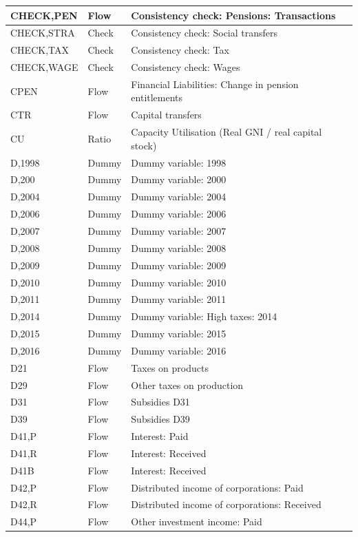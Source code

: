 \documentclass[
]{book}
\begin{document}
\begin{tabular}[t]{l|l|l}
\hline
CHECK,PEN & Flow & Consistency check: Pensions: Transactions\\
\hline
CHECK,STRA & Check & Consistency check: Social transfers\\
\hline
CHECK,TAX & Check & Consistency check: Tax\\
\hline
CHECK,WAGE & Check & Consistency check: Wages\\
\hline
CPEN & Flow & Financial Liabilities: Change in pension entitlements\\
\hline
CTR & Flow & Capital transfers\\
\hline
CU & Ratio & Capacity Utilisation (Real GNI  /  real capital stock)\\
\hline
D,1998 & Dummy & Dummy variable: 1998\\
\hline
D,200 & Dummy & Dummy variable: 2000\\
\hline
D,2004 & Dummy & Dummy variable: 2004\\
\hline
D,2006 & Dummy & Dummy variable: 2006\\
\hline
D,2007 & Dummy & Dummy variable: 2007\\
\hline
D,2008 & Dummy & Dummy variable: 2008\\
\hline
D,2009 & Dummy & Dummy variable: 2009\\
\hline
D,2010 & Dummy & Dummy variable: 2010\\
\hline
D,2011 & Dummy & Dummy variable: 2011\\
\hline
D,2014 & Dummy & Dummy variable: High taxes: 2014\\
\hline
D,2015 & Dummy & Dummy variable: 2015\\
\hline
D,2016 & Dummy & Dummy variable: 2016\\
\hline
D21 & Flow & Taxes on products\\
\hline
D29 & Flow & Other taxes on production\\
\hline
D31 & Flow & Subsidies D31\\
\hline
D39 & Flow & Subsidies D39\\
\hline
D41,P & Flow & Interest: Paid\\
\hline
D41,R & Flow & Interest: Received\\
\hline
D41B & Flow & Interest: Received\\
\hline
D42,P & Flow & Distributed income of corporations: Paid\\
\hline
D42,R & Flow & Distributed income of corporations: Received\\
\hline
D44,P & Flow & Other investment income: Paid\\

\end{tabular}
\end{document}
